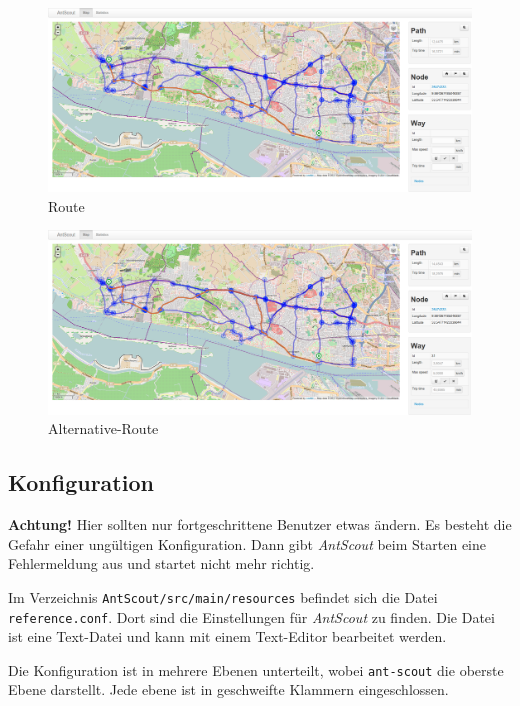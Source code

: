 \begin{figure}[htbp]
  \centering
  \includegraphics[width=\textwidth]{Bilder/Route.png}
  \caption{Route}
  \label{fig:route}
\end{figure}

\begin{figure}[htbp]
  \centering
  \includegraphics[width=\textwidth]{Bilder/Alternative-Route.png}
  \caption{Alternative-Route}
  \label{fig:alternative-route}
\end{figure}

\subsection{Konfiguration}
\label{sec:konfiguration}

\textbf{Achtung!}
Hier sollten nur fortgeschrittene Benutzer etwas ändern.
Es besteht die Gefahr einer ungültigen Konfiguration.
Dann gibt \textit{AntScout} beim Starten eine Fehlermeldung aus und startet nicht mehr richtig.

Im Verzeichnis \texttt{AntScout/src/main/resources} befindet sich die Datei \texttt{reference.conf}.
Dort sind die Einstellungen für \textit{AntScout} zu finden.
Die Datei ist eine Text-Datei und kann mit einem Text-Editor bearbeitet werden.

Die Konfiguration ist in mehrere Ebenen unterteilt, wobei \texttt{ant-scout} die oberste Ebene darstellt.
Jede ebene ist in geschweifte Klammern eingeschlossen.

